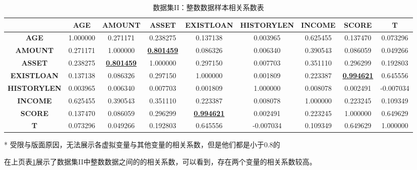 \documentclass[13.5pt,hyperref,a4paper,UTF8]{ctexart}
\begin{document}
\begin{table}
    \setlength{\belowcaptionskip}{0.2cm}
    \centering
    \caption{数据集II：整数数据样本相关系数表}
    \begin{threeparttable}
    \begin{tabular}{|c|c|c|c|c|c|c|c|c|}
    \hline
        \textbf{} & \textbf{AGE} & \textbf{AMOUNT} & \textbf{ASSET} & \textbf{EXISTLOAN} & \textbf{HISTORYLEN} & \textbf{INCOME} & \textbf{SCORE} & \textbf{T} \\ \hline
        \textbf{AGE} & 1.000000 & 0.271171 & 0.238275 & 0.137138 & 0.003965 & 0.625455 & 0.137470 & 0.073296 \\ \hline
        \textbf{AMOUNT} & 0.271171 & 1.000000 & \textbf{\underline{0.801459}} & 0.086326 & 0.006340 & 0.390543 & 0.086059 & 0.049266 \\ \hline
        \textbf{ASSET} & 0.238275 & \textbf{\underline{0.801459}} & 1.000000 & 0.297150 & 0.007703 & 0.351110 & 0.296299 & 0.192803 \\ \hline
        \textbf{EXISTLOAN} & 0.137138 & 0.086326 & 0.297150 & 1.000000 & 0.001809 & 0.223387 & \textbf{\underline{0.994621}} & 0.645556 \\ \hline
        \textbf{HISTORYLEN} & 0.003965 & 0.006340 & 0.007703 & 0.001809 & 1.000000 & 0.008078 & 0.002491 & -0.007034 \\ \hline
        \textbf{INCOME} & 0.625455 & 0.390543 & 0.351110 & 0.223387 & 0.008078 & 1.000000 & 0.223245 & 0.109349 \\ \hline
        \textbf{SCORE} & 0.137470 & 0.086059 & 0.296299 & \textbf{\underline{0.994621}} & 0.002491 & 0.223245 & 1.000000 & 0.649629 \\ \hline
        \textbf{T} & 0.073296 & 0.049266 & 0.192803 & 0.645556 & -0.007034 & 0.109349 & 0.649629 & 1.000000 \\ \hline
    \end{tabular}
    \label{整数数据样本相关系数表（数据集2）}
    \begin{tablenotes}
        \footnotesize
        \item[*] 受限与版面原因，无法展示各虚拟变量与其他变量的相关系数，但是他们都是小于0.8的  %

      \end{tablenotes}
    \end{threeparttable}
\end{table}

在上页表\ref{整数数据样本相关系数表（数据集2）}展示了数据集II中整数数据之间的的相关系数，可以看到，存在两个变量的相关系数较高。
\end{document}
